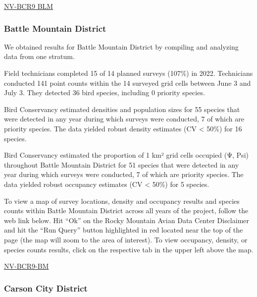 \documentclass[
  letterpaper,
  DIV=11,
  numbers=noendperiod,
  oneside]{scrreprt}
\begin{document}
\href{http://www.rmbo.org/new_site/adc/QueryWindow.aspx\#N4IgzgrgDgpgTmALnAhoiBbEAuABCAOQDUBaAIQGEAlATlzIBkBZEAXyA===}{NV-BCR9
BLM}

\hypertarget{battle-mountain-district}{%
\subsubsection{Battle Mountain
District}\label{battle-mountain-district}}

We obtained results for Battle Mountain District by compiling and
analyzing data from one stratum.

Field technicians completed 15 of 14 planned surveys (107\%) in 2022.
Technicians conducted 141 point counts within the 14 surveyed grid cells
between June 3 and July 3. They detected 36 bird species, including 0
priority species.

Bird Conservancy estimated densities and population sizes for 55 species
that were detected in any year during which surveys were conducted, 7 of
which are priority species. The data yielded robust density estimates
(CV \textless{} 50\%) for 16 species.

Bird Conservancy estimated the proportion of 1 km² grid cells occupied
(Ψ, Psi) throughout Battle Mountain District for 51 species that were
detected in any year during which surveys were conducted, 7 of which are
priority species. The data yielded robust occupancy estimates (CV
\textless{} 50\%) for 5 species.

To view a map of survey locations, density and occupancy results and
species counts within Battle Mountain District across all years of the
project, follow the web link below. Hit ``Ok'' on the Rocky Mountain
Avian Data Center Disclaimer and hit the ``Run Query'' button
highlighted in red located near the top of the page (the map will zoom
to the area of interest). To view occupancy, density, or species counts
results, click on the respective tab in the upper left above the map.

\href{http://www.rmbo.org/new_site/adc/QueryWindow.aspx\#N4IgzgLgTghhCuBbEAuABCAcgNQLQCEBhAJQE4CBZdfeKAUxnjQHsAzNAGRgDsATNCjxgBzOojrcIaXGnxwIAGzoDm8STACW3NABENkKBoDGEEAF8gA=}{NV-BCR9-BM}

\hypertarget{carson-city-district-1}{%
\subsubsection{Carson City District}\label{carson-city-district-1}}
\end{document}
